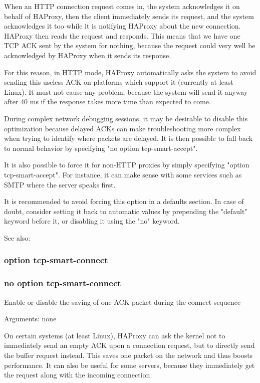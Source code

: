   When an HTTP connection request comes in, the system acknowledges it on
  behalf of HAProxy, then the client immediately sends its request, and the
  system acknowledges it too while it is notifying HAProxy about the new
  connection. HAProxy then reads the request and responds. This means that we
  have one TCP ACK sent by the system for nothing, because the request could
  very well be acknowledged by HAProxy when it sends its response.

  For this reason, in HTTP mode, HAProxy automatically asks the system to avoid
  sending this useless ACK on platforms which support it (currently at least
  Linux). It must not cause any problem, because the system will send it anyway
  after 40 ms if the response takes more time than expected to come.

  During complex network debugging sessions, it may be desirable to disable
  this optimization because delayed ACKs can make troubleshooting more complex
  when trying to identify where packets are delayed. It is then possible to
  fall back to normal behavior by specifying "no option tcp-smart-accept".

  It is also possible to force it for non-HTTP proxies by simply specifying
  "option tcp-smart-accept". For instance, it can make sense with some services
  such as SMTP where the server speaks first.

  It is recommended to avoid forcing this option in a defaults section. In case
  of doubt, consider setting it back to automatic values by prepending the
  "default" keyword before it, or disabling it using the "no" keyword.

  See also: 

\subsubsection{option tcp-smart-connect}
\subsubsection{no option tcp-smart-connect}


  Enable or disable the saving of one ACK packet during the connect sequence


  Arguments: none

  On certain systems (at least Linux), HAProxy can ask the kernel not to
  immediately send an empty ACK upon a connection request, but to directly
  send the buffer request instead. This saves one packet on the network and
  thus boosts performance. It can also be useful for some servers, because they
  immediately get the request along with the incoming connection.

